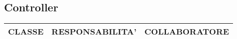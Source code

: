 \documentclass[11pt]{article}
\begin{document}
	\subsection{Controller}

	\begin{table}[h]
		\centering
		\begin{adjustbox}{max width=\textwidth}
			\begin{tabular}{|l|l|l|} \hline
			CLASSE  & RESPONSABILITA'                                                                                                                                                                                        & COLLABORATORE                                                                                                                                                                                                                                                                                                                                                                                                                                                                                                                                                                                                                                              \\\hline
			\hline

\end{tabular}
\end{adjustbox}
\end{table}
\end{document}
